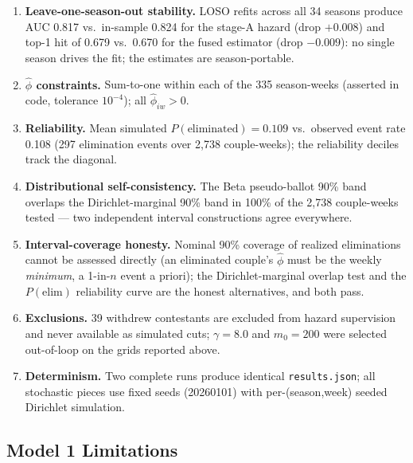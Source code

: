 \documentclass[10pt]{article}
\begin{document}
\begin{enumerate}[itemsep=2pt]
\item \textbf{Leave-one-season-out stability.} LOSO refits across all 34 seasons produce
AUC 0.817 vs.\ in-sample 0.824 for the stage-A hazard (drop $+0.008$) and
top-1 hit of 0.679 vs.\ 0.670 for the fused estimator (drop $-0.009$): no single season
drives the fit; the estimates are season-portable.
\item \textbf{$\hat\phi$ constraints.} Sum-to-one within each of the 335 season-weeks
(asserted in code, tolerance $10^{-4}$); all $\hat\phi_{iw} > 0$.
\item \textbf{Reliability.} Mean simulated $P(\text{eliminated}) = 0.109$ vs.\ observed
event rate 0.108 (297 elimination events over 2{,}738 couple-weeks); the reliability
deciles track the diagonal.
\item \textbf{Distributional self-consistency.} The Beta pseudo-ballot 90\% band overlaps
the Dirichlet-marginal 90\% band in 100\% of the 2{,}738 couple-weeks tested --- two
independent interval constructions agree everywhere.
\item \textbf{Interval-coverage honesty.} Nominal 90\% coverage of realized eliminations
cannot be assessed directly (an eliminated couple's $\hat\phi$ must be the weekly
\emph{minimum}, a 1-in-$n$ event a priori); the Dirichlet-marginal overlap test and the
$P(\text{elim})$ reliability curve are the honest alternatives, and both pass.
\item \textbf{Exclusions.} 39 withdrew contestants are excluded from hazard supervision
and never available as simulated cuts; $\gamma=8.0$ and $m_0=200$ were selected
out-of-loop on the grids reported above.
\item \textbf{Determinism.} Two complete runs produce identical \texttt{results.json};
all stochastic pieces use fixed seeds (20260101) with per-(season,week) seeded Dirichlet
simulation.
\end{enumerate}

\subsection{Model 1 Limitations}
\end{document}
